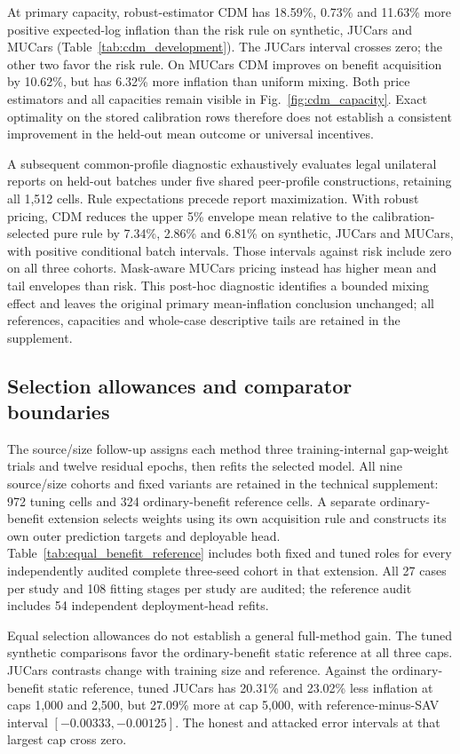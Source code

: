 At primary capacity, robust-estimator CDM has 18.59\%, 0.73\% and 11.63\%
more positive expected-log inflation than the risk rule on synthetic, JUCars
and MUCars (Table~\ref{tab:cdm_development}). The JUCars interval crosses zero;
the other two favor the risk rule. On MUCars CDM improves on benefit acquisition
by 10.62\%, but has 6.32\% more inflation than uniform mixing. Both price
estimators and all capacities remain visible in Fig.~\ref{fig:cdm_capacity}.
Exact optimality on the stored calibration rows therefore does not establish
a consistent improvement in the held-out mean outcome or universal incentives.

A subsequent common-profile diagnostic exhaustively evaluates legal
unilateral reports on held-out batches under five shared peer-profile
constructions, retaining all 1,512 cells. Rule expectations precede report
maximization. With robust pricing, CDM reduces the upper 5\% envelope mean
relative to the calibration-selected pure rule by 7.34\%, 2.86\% and 6.81\%
on synthetic, JUCars and MUCars, with positive conditional batch intervals.
Those intervals against risk include zero on all three cohorts. Mask-aware
MUCars pricing instead has higher mean and tail envelopes than risk.
This post-hoc diagnostic identifies a bounded mixing effect and leaves the
original primary mean-inflation conclusion unchanged; all references,
capacities and whole-case descriptive tails are retained in the supplement.

\subsection{Selection allowances and comparator boundaries}
The source/size follow-up assigns each method three training-internal
gap-weight trials and twelve residual epochs, then refits the selected model.
All nine source/size cohorts and fixed variants are retained in the
technical supplement: 972 tuning cells and 324 ordinary-benefit reference cells. A separate ordinary-benefit extension selects weights using its
own acquisition rule and constructs its own outer prediction targets and
deployable head. Table~\ref{tab:equal_benefit_reference} includes both fixed and
tuned roles for every independently audited complete three-seed cohort in that
extension. All 27 cases per study and 108 fitting stages per study are audited;
the reference audit includes 54 independent deployment-head refits.

Equal selection allowances do not establish a general full-method gain.
The tuned synthetic comparisons favor the ordinary-benefit static reference
at all three caps. JUCars contrasts change with training size and reference.
Against the ordinary-benefit static reference, tuned JUCars has 20.31\%
and 23.02\% less inflation at caps 1,000 and 2,500, but 27.09\% more
at cap 5,000, with reference-minus-SAV interval $[-0.00333,-0.00125]$.
The honest and attacked error intervals at that largest cap cross zero.

